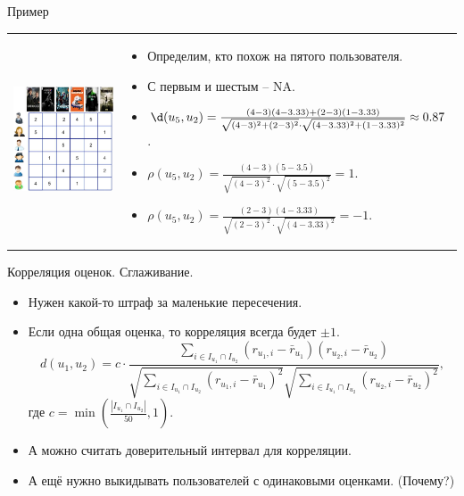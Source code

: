 \documentclass[9pt]{beamer}
\begin{document}
\begin{frame}{Пример}
\begin{center}
\begin{tabular}{p{}p{}}
     \begin{center}\includegraphics[height=150px]{img/collaborative_filtering_correlation.png}\end{center}&
     \begin{itemize}
        \item Определим, кто похож на пятого пользователя.
        \pause
        \item С первым и шестым -- NA.
        \item $\d(u_5, u_2) = \frac{(4-3)(4-3.33) + (2-3)(1-3.33)}{\sqrt{(4-3)^2 + (2-3)^2} \cdot \sqrt{(4-3.33)^2 + (1-3.33)^2}} \approx 0.87$.
        \item $\rho(u_5, u_2) = \frac{(4-3)(5-3.5)}{\sqrt{(4-3)^2} \cdot \sqrt{(5-3.5)^2}} = 1$.
        \item $\rho(u_5, u_2) = \frac{(2-3)(4-3.33)}{\sqrt{(2-3)^2} \cdot \sqrt{(4-3.33)^2}} = -1$.
     \end{itemize}
\end{tabular}
\end{center}
\end{frame}

\begin{frame}{Корреляция оценок. Сглаживание.}
\begin{itemize}
    \item Нужен какой-то штраф за маленькие пересечения.
    \item Если одна общая оценка, то корреляция всегда будет $\pm 1$.
    $$d(u_1, u_2) = c\cdot \frac{\sum\limits_{i\in I_{u_1}\cap I_{u_2}} (r_{u_1, i} - \bar r_{u_1}) (r_{u_2, i} - \bar r_{u_2})}{\sqrt{\sum\limits_{i\in I_{u_1}\cap I_{u_2}} (r_{u_1, i} - \bar r_{u_1})^2} {\sqrt{\sum\limits_{i\in I_{u_1}\cap I_{u_2}} (r_{u_2, i} - \bar r_{u_2})^2}}  },$$
где \( c = \min\left(\frac{|I_{u_1}\cap I_{u_2}|}{50}, 1\right)\).
    \item А можно считать доверительный интервал для корреляции.
    \item А ещё нужно выкидывать пользователей с одинаковыми оценками. (Почему?)
\end{itemize}
\end{frame}
\end{document}
